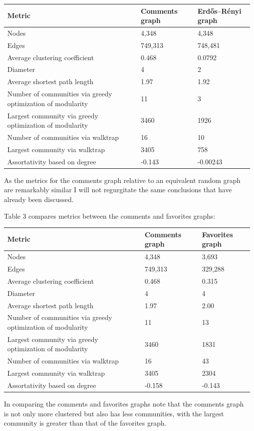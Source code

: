 \begin{tabular}{|l|l|l|}\hline
Metric & Comments graph & Erdős–Rényi graph \\ \hline
Nodes  & 4,348 & 4,348 \\
Edges  & 749,313 & 748,481 \\
Average clustering coefficient & 0.468 & 0.0792 \\
Diameter & 4 & 2 \\
Average shortest path length & 1.97 & 1.92 \\
Number of communities via greedy optimization of modularity & 11 & 3 \\
Largest community via greedy optimization of modularity & 3460 & 1926 \\
Number of communities via walktrap & 16 & 10 \\
Largest community via walktrap & 3405 & 758 \\
Assortativity based on degree & -0.143 & -0.00243 \\
\end{tabular}

As the metrics for the comments graph relative to an equivalent random
graph are remarkably similar I will not regurgitate the same conclusions
that have already been discussed.

Table 3 compares metrics between the comments and favorites graphs:

\begin{tabular}{|l|l|l|}\hline
Metric & Comments graph & Favorites graph \\ \hline
Nodes  & 4,348 & 3,693 \\
Edges  & 749,313 & 329,288 \\
Average clustering coefficient & 0.468 & 0.315 \\
Diameter & 4 & 4 \\
Average shortest path length & 1.97 & 2.00 \\
Number of communities via greedy optimization of modularity & 11 & 13 \\
Largest community via greedy optimization of modularity & 3460 & 1831 \\
Number of communities via walktrap & 16 & 43 \\
Largest community via walktrap & 3405 & 2304 \\
Assortativity based on degree & -0.158 & -0.143 \\
\end{tabular}

In comparing the comments and favorites graphs note that the comments
graph is not only more clustered but also has less communities, with the
largest community is greater than that of the favorites graph.

